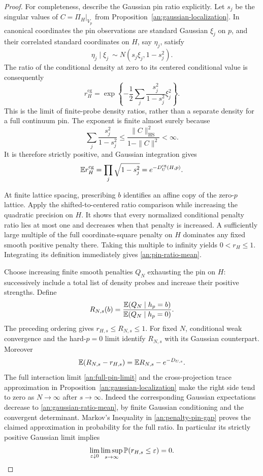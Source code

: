 \begin{proof}
For completeness, describe the
Gaussian pin ratio explicitly.
Let $s_j$ be the singular values of
$C=\Pi_H|_{V_p}$ from
Proposition~\ref{an:gaussian-localization}.
In canonical coordinates the pin
observations are standard Gaussian
$\xi_j$ on $p$, and their correlated
standard coordinates on $H$, say
$\eta_j$, satisfy
\[
 \eta_j\mid\xi_j\ \sim
 N(s_j\xi_j,1-s_j^2).
\]
The ratio of the conditional density
at zero to its centered conditional
value is consequently
\begin{equation}
 r_H^{\mathrm{cg}}
 =\exp\left\{-\frac12\sum_j
           \frac{s_j^2}{1-s_j^2}\xi_j^2\right\}.
 \label{an:gaussian-ratio}
\end{equation}
This is the limit of finite-probe
density ratios, rather than a
separate density for a full
continuum pin.  The exponent is
finite almost surely because
\[
 \sum_j\frac{s_j^2}{1-s_j^2}
    \le\frac{\|C\|_{\mathrm{HS}}^2}{1-\|C\|^2}<\infty.
\]
It is therefore strictly positive,
and Gaussian integration gives
\begin{equation}
 \mathbb E r_H^{\mathrm{cg}}
       =\prod_j\sqrt{1-s_j^2}
       =e^{-D_U^{\mathrm{cg}}(H,p)}.
 \label{an:gaussian-ratio-mean}
\end{equation}

At finite lattice spacing, prescribing
$b$ identifies an affine copy of the
zero-$p$ lattice.  Apply the
shifted-to-centered ratio comparison
while increasing the quadratic
precision on $H$.  It shows that
every normalized conditional penalty
ratio lies at most one and decreases
when that penalty is increased.
A sufficiently large multiple of
the full coordinate-square penalty
on $H$ dominates any fixed smooth
positive penalty there.  Taking
this multiple to infinity yields
$0<r_H\le1$.  Integrating its
definition immediately gives
\eqref{an:pin-ratio-mean}.

Choose increasing finite smooth
penalties $Q_N$ exhausting the pin
on $H$: successively include a
total list of density probes and
increase their positive strengths.
Define
\[
 R_{N,s}(b)=
    \frac{\mathbb E(Q_N\mid h_p=b)}{\mathbb E(Q_N\mid h_p=0)}.
\]
The preceding ordering gives
$r_{H,s}\le R_{N,s}\le1$.
For fixed $N$, conditional weak
convergence and the hard-$p=0$
limit identify $R_{N,s}$ with its
Gaussian counterpart.  Moreover
\begin{equation}
 \mathbb E(R_{N,s}-r_{H,s})
       =\mathbb E R_{N,s}-e^{-D_{U,s}}.
 \label{an:penalty-pin-gap}
\end{equation}
The full interaction limit
\eqref{an:full-pin-limit} and the
cross-projection trace approximation
in Proposition~\ref{an:gaussian-localization}
make the right side tend to zero
as $N\to\infty$ after $s\to\infty$.
Indeed the corresponding Gaussian
expectations decrease to
\eqref{an:gaussian-ratio-mean}, by
finite Gaussian conditioning and
the convergent determinant.  Markov's
Inequality in \eqref{an:penalty-pin-gap}
proves the claimed approximation
in probability for the full ratio.
In particular its strictly positive
Gaussian limit implies
\begin{equation}
 \lim_{\varepsilon\downarrow0}\limsup_{s\to\infty}
         \mathbb P(r_{H,s}\le\varepsilon)=0.
 \label{an:pin-ratio-away-zero}
\end{equation}


\end{proof}
